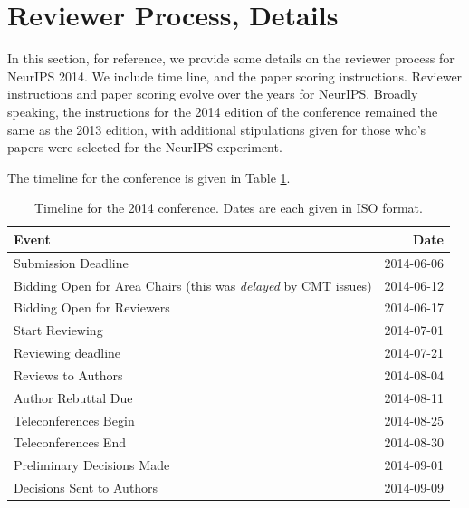 


\section{Reviewer Process, Details}
\label{app:review-details}

In this section, for reference, we provide some details on the reviewer process for NeurIPS 2014. We include time line, and the paper scoring instructions. Reviewer instructions and paper scoring evolve over the years for NeurIPS. Broadly speaking, the instructions for the 2014 edition of the conference remained the same as the 2013 edition, with additional stipulations given for those who's papers were selected for the NeurIPS experiment.

The timeline for the conference is given in Table \ref{table-reviewing-timeline}.


\begin{table}
    \centering
    \caption{Timeline for the 2014 conference. Dates are each given in ISO format.}
    \label{table-reviewing-timeline}
    
    \begin{tabular}{l|r}
    Event & Date \\ \hline
    
        Submission Deadline & 2014-06-06  \\
        Bidding Open for Area Chairs (this was \emph{delayed} by
  CMT issues) & 2014-06-12 \\
  Bidding Open for Reviewers & 2014-06-17 \\
  Start Reviewing & 2014-07-01 \\
  Reviewing deadline & 2014-07-21 \\
  Reviews to Authors & 2014-08-04 \\
  Author Rebuttal Due & 2014-08-11 \\
  Teleconferences Begin & 2014-08-25 \\
  Teleconferences End & 2014-08-30 \\
  Preliminary Decisions Made & 2014-09-01 \\
  Decisions Sent to Authors & 2014-09-09
    \end{tabular}
    
\end{table}

